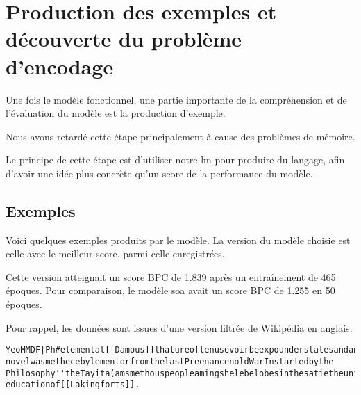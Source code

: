 \section{Production des exemples et découverte du problème d'encodage}
Une fois le modèle fonctionnel, une partie importante de la compréhension et de l'évaluation du modèle est la production d'exemple.

Nous avons retardé cette étape principalement à cause des problèmes de mémoire.

Le principe de cette étape est d'utiliser notre \gls{lm} pour produire du langage, afin d'avoir une idée plus concrète qu'un score de la performance du modèle.

\subsection{Exemples}
Voici quelques exemples produits par le modèle. 
La version du modèle choisie est celle avec le meilleur score, parmi celle enregistrées.

Cette version atteignait un score BPC de 1.839 après un entraînement de 465 époques.
Pour comparaison, le modèle \gls{soa} avait un score BPC de 1.255 en 50 époques.

Pour rappel, les données sont issues d'une version filtrée de Wikipédia en anglais.

\begin{lstlisting}[caption={Exemple 1~: une suite de caractères à priori incompréhensibles},label=gmsnn_ex1]
YeoMMDF|Ph#elementat[[Damous]]thatureoftenusevoirbeexpounderstatesandanumberofhisworkformembersothan novelwasmethecebylementorfromthelastPreenancenoldWarInstartedbythe Philosophy''theTayita(amsmethouspeopleamingshelebelobesinthesatietheuniversalistscientis educationof[[Lakingforts]].
\end{lstlisting}

